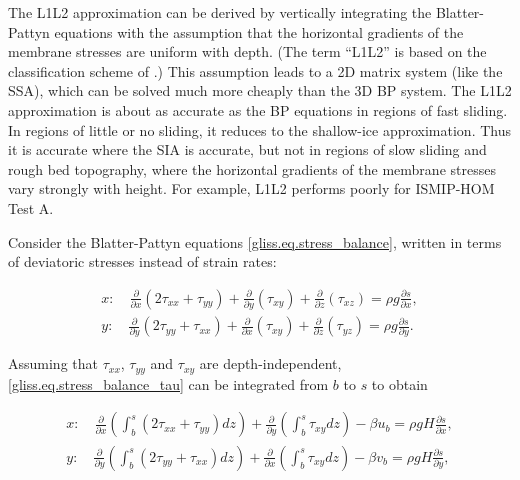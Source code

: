 {The L1L2 approximation \citep{Schoof:2010dl} can be derived by vertically integrating
the Blatter-Pattyn equations with the assumption that the horizontal gradients of the membrane
stresses are uniform with depth.
(The term ``L1L2'' is based on the classification scheme of \citet{Hindmarsh2004}.)  
This assumption leads to a 2D matrix system (like the SSA), which can be solved
much more cheaply than the 3D BP system.
The L1L2 approximation is about as accurate as the BP equations in
regions of fast sliding.  In regions of little or no sliding, it reduces to the
shallow-ice approximation.  Thus it is accurate where the SIA is accurate,
but not in regions of slow sliding and rough bed topography, where
the horizontal gradients of the membrane stresses vary strongly with height.
For example, L1L2 performs poorly for ISMIP-HOM Test A.

Consider the Blatter-Pattyn equations \eqref{gliss.eq.stress_balance}, written in
terms of deviatoric stresses instead of strain rates:

\begin{equation}
  \label{gliss.eq.stress_balance_tau}
  \begin{split}
    x: \quad \frac{\partial }{\partial x}\left( 2 \tau_{xx} + \tau_{yy} \right)
           + \frac{\partial }{\partial y}\left( \tau_{xy} \right)
           + \frac{\partial }{\partial z}\left( \tau_{xz} \right)
           = \rho g\frac{\partial s}{\partial x}, \\
    y: \quad \frac{\partial }{\partial y}\left( 2 \tau_{yy} + \tau_{xx} \right)
           + \frac{\partial }{\partial x}\left( \tau_{xy} \right)
           + \frac{\partial }{\partial z}\left( \tau_{yz} \right)
           = \rho g\frac{\partial s}{\partial y}.
  \end{split}
\end{equation}

\noindent
Assuming that $\tau_{xx}$, $\tau_{yy}$ and $\tau_{xy}$ are depth-independent,
\eqref{gliss.eq.stress_balance_tau} can be integrated from $b$ to $s$ to obtain

\begin{equation}
  \label{gliss.eq.stress_balance_tau_integrated}
  \begin{split}
    x: \quad \frac{\partial }{\partial x} \left( \int_b^s (2 \tau_{xx} + \tau_{yy}) dz \right)
           + \frac{\partial }{\partial y} \left( \int_b^s {\tau_{xy} dz} \right)
           - \beta u_b = \rho g H \frac{\partial s}{\partial x}, \\
    y: \quad \frac{\partial }{\partial y} \left( \int_b^s (2 \tau_{yy} + \tau_{xx}) dz \right)
           + \frac{\partial }{\partial x} \left( \int_b^s {\tau_{xy} dz} \right)
           - \beta v_b = \rho g H \frac{\partial s}{\partial y},
  \end{split}
\end{equation}

}
